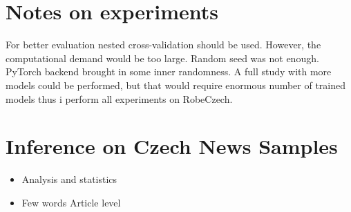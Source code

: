 \section{Notes on experiments}

For better evaluation nested cross-validation should be used. However, the computational demand would be too large. Random seed was not enough. PyTorch backend brought in some inner randomness.
  A full study with more models could be performed, but that would require enormous number of trained models thus i perform all experiments on RobeCzech.
  
  

\section{Inference on Czech News Samples}
\begin{itemize}
    \item Analysis and statistics
    \item Few words Article level
\end{itemize}


